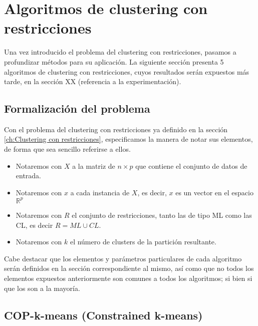 \chapter{Algoritmos de clustering con restricciones}\label{ch:Algoritmos de clustering con restricciones}

Una vez introducido el problema del clustering con restricciones, pasamos a profundizar métodos para su aplicación. La siguiente sección presenta 5 algoritmos de clustering con restricciones, cuyos resultados serán expuestos más tarde, en la sección XX (referencia a la experimentación).

\section{Formalización del problema}

Con el problema del clustering con restricciones ya definido en la sección \ref{ch:Clustering con restricciones}, especificamos la manera de notar sus elementos, de forma que sea sencillo referirse a ellos.

\begin{itemize}
	
	\item Notaremos con $X$ a la matriz de $n\times p$ que contiene el conjunto de datos de entrada.
	
	\item Notaremos con $x$ a cada instancia de $X$, es decir, $x$ es un vector en el espacio $\mathbb{R}^p$
	
	\item Notaremos con $R$ el conjunto de restricciones, tanto las de tipo \acs{ML} como las \acs{CL}, es decir $R = ML \cup CL$. 
	
	\item Notaremos con $k$ el número de clusters de la partición resultante.
	
\end{itemize}

Cabe destacar que los elementos y parámetros particulares de cada algoritmo serán definidos en la sección correspondiente al mismo, así como que no todos los elementos expuestos anteriormente son comunes a todos los algoritmos; si bien si que los son a la mayoría.

\section{COP-k-means (Constrained k-means)}

